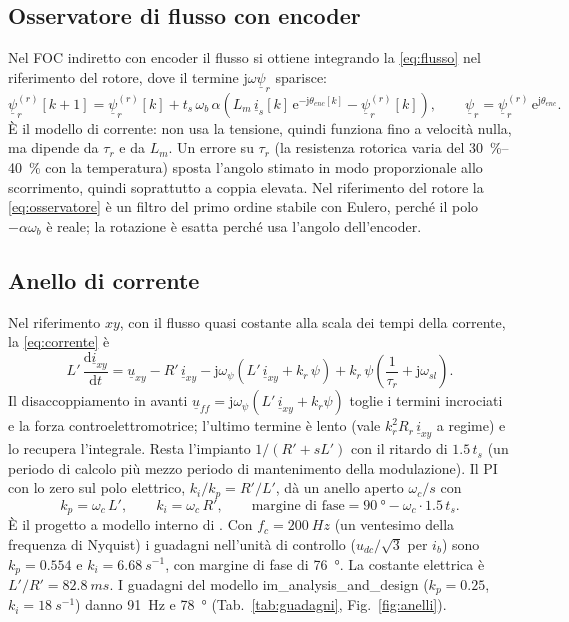 \documentclass[10pt,a4paper]{scrartcl}
\newcommand{\jj}{\mathrm{j}}
\newcommand{\ee}{\mathrm{e}}
\newcommand{\dif}{\mathrm{d}}
\newcommand{\ts}{t_s}
\newcommand{\wb}{\omega_b}
\newcommand{\isv}{\underline{i}_s}
\newcommand{\psv}{\underline{\psi}_r}
\newcommand{\kr}{k_r}
\newcommand{\Lp}{L'}
\newcommand{\Rp}{R'}
\newcommand{\taur}{\tau_r}
\begin{document}
\begin{onehalfspace}
\subsection{Osservatore di flusso con encoder}
\label{sec:osservatore}

Nel FOC indiretto con encoder il flusso si ottiene integrando la \eqref{eq:flusso} nel riferimento del rotore, dove il termine $\jj\omega\psv$ sparisce:
\begin{equation}
\psv^{(r)}[k+1] = \psv^{(r)}[k] + \ts\,\wb\,\alpha\left(L_m\,\isv[k]\,\ee^{-\jj\theta_{enc}[k]} - \psv^{(r)}[k]\right), \qquad \psv = \psv^{(r)}\,\ee^{\jj\theta_{enc}}.
\label{eq:osservatore}
\end{equation}
È il modello di corrente: non usa la tensione, quindi funziona fino a velocità nulla, ma dipende da $\taur$ e da $L_m$. Un errore su $\taur$ (la resistenza rotorica varia del \SIrange{30}{40}{\percent} con la temperatura) sposta l'angolo stimato in modo proporzionale allo scorrimento, quindi soprattutto a coppia elevata. Nel riferimento del rotore la \eqref{eq:osservatore} è un filtro del primo ordine stabile con Eulero, perché il polo $-\alpha\wb$ è reale; la rotazione è esatta perché usa l'angolo dell'encoder.

\subsection{Anello di corrente}
\label{sec:anellocorrente}

Nel riferimento $xy$, con il flusso quasi costante alla scala dei tempi della corrente, la \eqref{eq:corrente} è
\begin{equation}
\Lp\,\frac{\dif\underline{i}_{xy}}{\dif t} = \underline{u}_{xy} - \Rp\,\underline{i}_{xy} - \jj\omega_\psi\left(\Lp\,\underline{i}_{xy} + \kr\,\psi\right) + \kr\,\psi\left(\frac{1}{\taur} + \jj\omega_{sl}\right).
\label{eq:correntexy}
\end{equation}
Il disaccoppiamento in avanti $\underline{u}_{ff} = \jj\omega_\psi(\Lp\,\underline{i}_{xy} + \kr\psi)$ toglie i termini incrociati e la forza controelettromotrice; l'ultimo termine è lento (vale $\kr^2 R_r\,\underline{i}_{xy}$ a regime) e lo recupera l'integrale. Resta l'impianto $1/(\Rp + s\Lp)$ con il ritardo di $1.5\,\ts$ (un periodo di calcolo più mezzo periodo di mantenimento della modulazione). Il PI con lo zero sul polo elettrico, $k_i/k_p = \Rp/\Lp$, dà un anello aperto $\omega_c/s$ con
\begin{equation}
k_p = \omega_c\,\Lp, \qquad k_i = \omega_c\,\Rp, \qquad \text{margine di fase} = \SI{90}{\degree} - \omega_c\cdot 1.5\,\ts.
\label{eq:imc}
\end{equation}
È il progetto a modello interno di \cite{harnefors1998}. Con $f_c = \SI{200}{Hz}$ (un ventesimo della frequenza di Nyquist) i guadagni nell'unità di controllo ($u_{dc}/\sqrt3$ per $i_b$) sono $k_p = \num{0.554}$ e $k_i = \SI{6.68}{s^{-1}}$, con margine di fase di \SI{76}{\degree}. La costante elettrica è $\Lp/\Rp = \SI{82.8}{ms}$. I guadagni del modello im\_analysis\_and\_design ($k_p = \num{0.25}$, $k_i = \SI{18}{s^{-1}}$) danno \SI{91}{Hz} e \SI{78}{\degree} (Tab.~\ref{tab:guadagni}, Fig.~\ref{fig:anelli}).


\end{onehalfspace}
\end{document}
